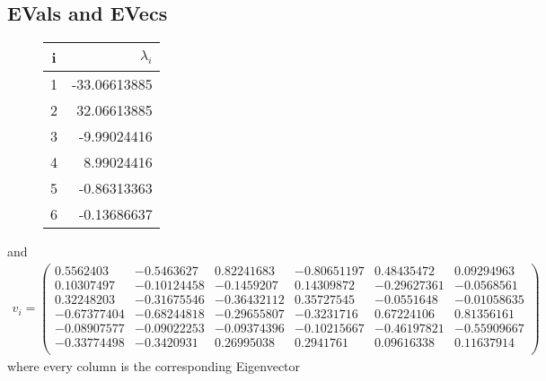 \documentclass[11pt, a4paper, reqno]{scrartcl}
\begin{document}
    \subsection{EVals and EVecs}
        \begin{figure}[H]
            \centering
            \begin{tabular}{c|r}
                i & $\lambda_i$\\
                \hline
                1 & -33.06613885\\
                2 & 32.06613885\\
                3 & -9.99024416\\
                4 &  8.99024416\\
                5 & -0.86313363\\
                6 & -0.13686637\\
            \end{tabular}
        \end{figure}
        and 
        \begin{align}v_i = 
            \begin{pmatrix}
                0.5562403 & -0.5463627 & 0.82241683 & -0.80651197 & 0.48435472 & 0.09294963\\
                0.10307497 & -0.10124458 & -0.1459207 & 0.14309872 & -0.29627361 & -0.0568561\\
                0.32248203 & -0.31675546 & -0.36432112 & 0.35727545 & -0.0551648 & -0.01058635\\
                -0.67377404 & -0.68244818 & -0.29655807 & -0.3231716 & 0.67224106 & 0.81356161\\
                -0.08907577 & -0.09022253 & -0.09374396 & -0.10215667 & -0.46197821 & -0.55909667\\
                -0.33774498 & -0.3420931 & 0.26995038 & 0.2941761 & 0.09616338 & 0.11637914\\
            \end{pmatrix}
        \end{align}
        where every column is the corresponding Eigenvector
\end{document}
